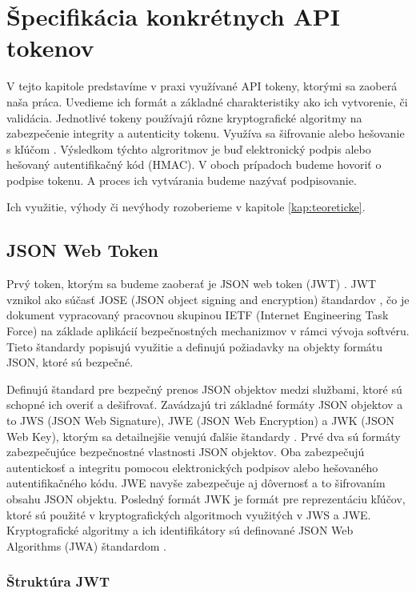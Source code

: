 \chapter{Špecifikácia konkrétnych API tokenov}

\label{kap:typy} %

V tejto kapitole predstavíme v praxi využívané API tokeny, ktorými sa zaoberá naša práca. Uvedieme ich formát a základné charakteristiky ako ich vytvorenie, či validácia. Jednotlivé tokeny používajú rôzne kryptografické algoritmy na zabezpečenie integrity a autenticity tokenu. Využíva sa šifrovanie alebo hešovanie s kľúčom \cite{hmac}. Výsledkom týchto algroritmov je buď elektronický podpis alebo hešovaný autentifikačný kód (HMAC). V oboch prípadoch budeme hovoriť o podpise tokenu. A proces ich vytvárania budeme nazývať podpisovanie.

Ich využitie, výhody či nevýhody rozoberieme v kapitole \ref{kap:teoreticke}.


\section{JSON Web Token}

Prvý token, ktorým sa budeme zaoberať je JSON web token (JWT) \cite{jwt_rfc}. JWT vznikol ako súčasť JOSE (JSON object signing and encryption) štandardov \cite{jose_rfc}, čo je dokument vypracovaný pracovnou skupinou IETF (Internet Engineering Task Force) na základe aplikácií bezpečnostných mechanizmov v rámci vývoja softvéru. Tieto štandardy popisujú využitie a definujú požiadavky na objekty formátu JSON, ktoré sú bezpečné.

Definujú štandard pre bezpečný prenos JSON objektov medzi službami, ktoré sú schopné ich overiť a dešifrovať. Zavádzajú tri základné formáty JSON objektov a to JWS (JSON Web Signature), JWE (JSON Web Encryption) a JWK (JSON Web Key), ktorým sa detailnejšie venujú ďalšie štandardy \cite{jws_rfc, jwe_rfc, jwk_rfc}. Prvé dva sú formáty zabezpečujúce bezpečnostné vlastnosti JSON objektov. Oba zabezpečujú autentickosť a integritu pomocou elektronických podpisov alebo hešovaného autentifikačného kódu. JWE navyše zabezpečuje aj dôvernosť a to šifrovaním obsahu JSON objektu. Posledný formát JWK je formát pre reprezentáciu kľúčov, ktoré sú použité v kryptografických algoritmoch využitých v JWS a JWE. Kryptografické algoritmy a ich identifikátory sú definované JSON Web Algorithms (JWA) štandardom \cite{jwa_rfc}.


\subsection{Štruktúra JWT}

